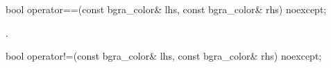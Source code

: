 \begin{itemdecl}
bool operator==(const bgra_color& lhs, const bgra_color& rhs) noexcept;
\end{itemdecl}
\begin{itemdescr}
\pnum
\returns
{}.
\end{itemdescr}

\begin{itemdecl}
bool operator!=(const bgra_color& lhs, const bgra_color& rhs) noexcept;
\end{itemdecl}
\begin{itemdescr}
\pnum
\returns
{}
\end{itemdescr}
